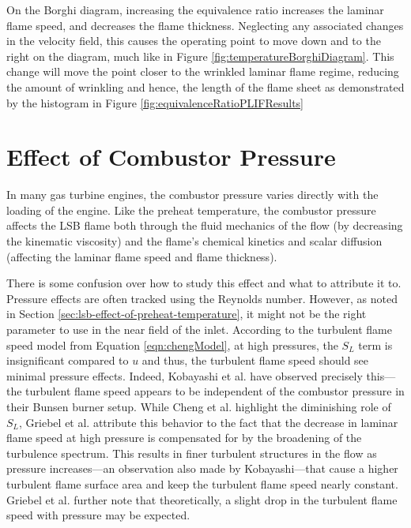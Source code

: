 

On the Borghi diagram, increasing the equivalence ratio increases the laminar flame speed, and decreases the flame thickness.
Neglecting any associated changes in the velocity field, this causes the operating point to move down and to the right on the diagram, much like in Figure \ref{fig:temperatureBorghiDiagram}.
This change will move the point closer to the wrinkled laminar flame regime, reducing the amount of wrinkling and hence, the length of the flame sheet as demonstrated by the histogram in Figure \ref{fig:equivalenceRatioPLIFResults}

\section{Effect of Combustor Pressure}
\label{sec:lsb-effect-of-combustor-pressure}

In many gas turbine engines, the combustor pressure varies directly with the loading of the engine.
Like the preheat temperature, the combustor pressure affects the LSB flame both through the fluid mechanics of the flow (by decreasing the kinematic viscosity) and the flame's chemical kinetics and scalar diffusion (affecting the laminar flame speed and flame thickness).

There is some confusion over how to study this effect and what to attribute it to.
Pressure effects are often tracked using the Reynolds number.
However, as noted in Section \ref{sec:lsb-effect-of-preheat-temperature}, it might not be the right parameter to use in the near field of the inlet.
According to the turbulent flame speed model from Equation \ref{eqn:chengModel}, at high pressures, the \(S_L\) term is insignificant compared to \(u\) and thus, the turbulent flame speed should see minimal pressure effects.
Indeed, Kobayashi et al.\cite{1998-kobayashi,2002-kobayashi-b} have observed precisely this---the turbulent flame speed appears to be independent of the combustor pressure in their Bunsen burner setup.
While Cheng et al. highlight the diminishing role of \(S_L\), Griebel et al.\cite{2007-griebel} attribute this behavior to the fact that the decrease in laminar flame speed at high pressure is compensated for by the broadening of the turbulence spectrum.
This results in finer turbulent structures in the flow as pressure increases---an observation also made by Kobayashi\cite{1997-kobayashi}---that cause a higher turbulent flame surface area and keep the turbulent flame speed nearly constant.
Griebel et al. further note that theoretically, a slight drop in the turbulent flame speed with pressure may be expected.

